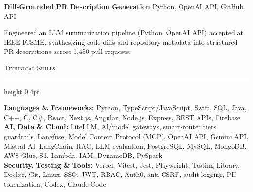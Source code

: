 \documentclass[letterpaper,11pt]{article}
\newcommand{\resumesection}[1]{%
  \par\vspace{2pt}%
  {\large\scshape #1}\par\vspace{2pt}%
  \hrule height 0.4pt\vspace{2pt}%
}
\newcommand{\projectHeading}[2]{
  \textbf{#1} \hfill #2
}
\begin{document}
\vspace{-4pt}
\projectHeading{Diff-Grounded PR Description Generation}{Python, OpenAI API, GitHub API}
\begin{tightitemize}
  \item Engineered an LLM summarization pipeline (Python, OpenAI API) accepted at IEEE ICSME, synthesizing code diffs and repository metadata into structured PR descriptions across 1,450 pull requests.
\end{tightitemize}

\vspace{-4pt}
\resumesection{Technical Skills}
\textbf{Languages \& Frameworks:} Python, TypeScript/JavaScript, Swift, SQL, Java, C++, C, C\#, React, Next.js, Angular, Node.js, Express, REST APIs, Firebase\\
\textbf{AI, Data \& Cloud:} LiteLLM, AI/model gateways, smart-router tiers, guardrails, Langfuse, Model Context Protocol (MCP), OpenAI API, Gemini API, Mistral AI, LangChain, RAG, LLM evaluation, PostgreSQL, MySQL, MongoDB, AWS Glue, S3, Lambda, IAM, DynamoDB, PySpark\\
\textbf{Security, Testing \& Tools:} Vercel, Vitest, Jest, Playwright, Testing Library, Docker, Git, Linux, SSO, JWT, RBAC, Auth0, anti-CSRF, audit logging, PII tokenization, Codex, Claude Code
\end{document}
